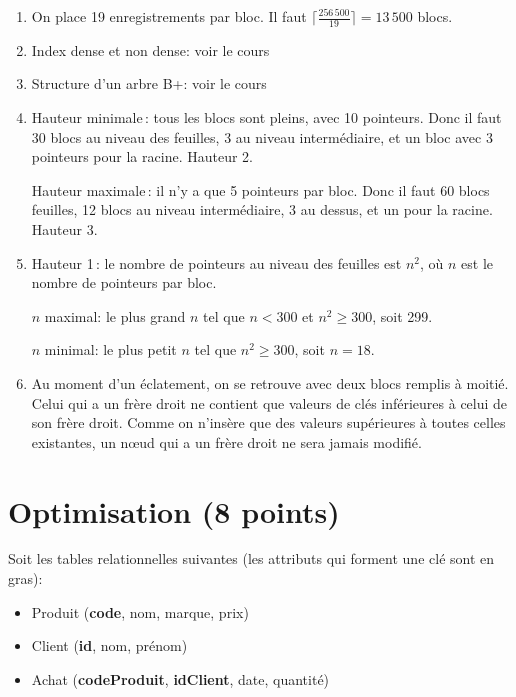 \begin{solution}
\begin{enumerate}
  \item On place 19 enregistrements par bloc.  Il faut 
        $\lceil \frac{256\,500}{19} \rceil = 13\,500$ blocs.

  \item Index dense et non dense: voir le cours
 
  \item Structure d'un arbre B+: voir le cours

 \item Hauteur minimale\,: tous les blocs sont pleins, avec 10 pointeurs.
   Donc il faut 30 blocs au niveau des feuilles, 3 au niveau
     intermédiaire, et un bloc avec 3 pointeurs pour la racine.
   Hauteur 2.

    Hauteur maximale\,: il n'y a que 5 pointeurs par bloc. 
    Donc il faut 60 blocs feuilles, 12 blocs au niveau intermédiaire,
    3 au dessus, et un pour la racine. Hauteur 3.

   \item Hauteur 1\,: le nombre de pointeurs au niveau des feuilles
           est $n^2$, où $n$ est le nombre de pointeurs par bloc.
  
      $n$ maximal: le plus grand $n$ tel que $n < 300$ et $n^2 \geq 300$,
          soit 299.

    $n$ minimal: le plus petit $n$ tel que $n^2 \geq 300$, soit $n=18$.

   \item Au moment d'un éclatement, on se retrouve avec deux blocs
     remplis à moitié. Celui qui a un frère droit ne contient que
     valeurs de clés inférieures à celui de son frère droit.
     Comme on n'insère que des valeurs supérieures à toutes celles
     existantes, un n{\oe}ud qui a un frère droit ne sera jamais modifié.
\end{enumerate}
\end{solution}


\section{Optimisation (8 points)}

Soit les tables relationnelles suivantes (les attributs qui forment 
une clé sont en gras):

\begin{itemize}
  \item Produit  (\textbf{code}, nom, marque, prix)
  \item Client  (\textbf{id}, nom, prénom)
  \item Achat    (\textbf{codeProduit}, \textbf{idClient}, date, quantité)
\end{itemize}


